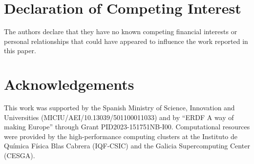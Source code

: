 \documentclass[final,5p,times,twocolumn]{elsarticle}
\begin{document}
\section*{Declaration of Competing Interest}
The authors declare that they have no known competing financial
interests or personal relationships that could have appeared to
influence the work reported in this paper. 

\section*{Acknowledgements}
\enlargethispage{2\baselineskip}
This work was supported by the Spanish Ministry of Science, Innovation
and Universities (MICIU/AEI/10.13039/501100011033) and by ``ERDF A way
of making Europe'' through Grant PID2023-151751NB-I00. Computational
resources were provided by the high-performance computing clusters at
the Instituto de Qu{\'{i}}mica F{\'{i}}sica Blas Cabrera (IQF-CSIC)
and the Galicia Supercomputing Center (CESGA).  

%
%
\end{document}
